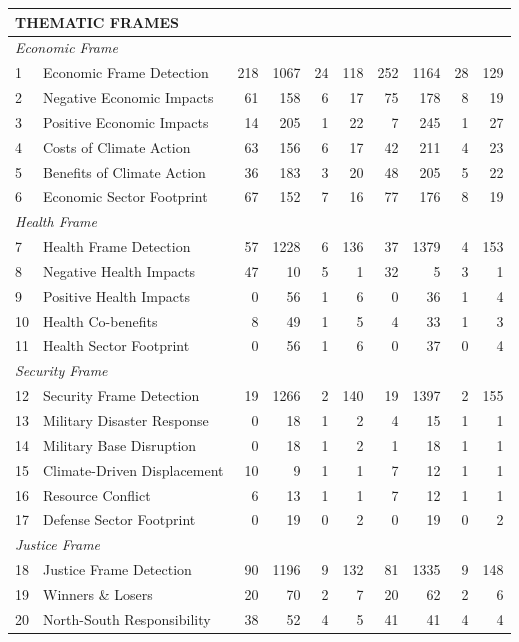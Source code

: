 {\begin{longtable}{p{0.5cm}p{5.5cm}rrrrrrrr}
\multicolumn{10}{l}{\cellcolor{gray!10}\textbf{THEMATIC FRAMES}} \\
\midrule
\multicolumn{10}{l}{\textit{Economic Frame}} \\
1 & Economic Frame Detection & 218 & 1067 & 24 & 118 & 252 & 1164 & 28 & 129 \\
2 & Negative Economic Impacts & 61 & 158 & 6 & 17 & 75 & 178 & 8 & 19 \\
3 & Positive Economic Impacts & 14 & 205 & 1 & 22 & 7 & 245 & 1 & 27 \\
4 & Costs of Climate Action & 63 & 156 & 6 & 17 & 42 & 211 & 4 & 23 \\
5 & Benefits of Climate Action & 36 & 183 & 3 & 20 & 48 & 205 & 5 & 22 \\
6 & Economic Sector Footprint & 67 & 152 & 7 & 16 & 77 & 176 & 8 & 19 \\
\multicolumn{10}{l}{\textit{Health Frame}} \\
7 & Health Frame Detection & 57 & 1228 & 6 & 136 & 37 & 1379 & 4 & 153 \\
8 & Negative Health Impacts & 47 & 10 & 5 & 1 & 32 & 5 & 3 & 1 \\
9 & Positive Health Impacts & 0 & 56 & 1 & 6 & 0 & 36 & 1 & 4 \\
10 & Health Co-benefits & 8 & 49 & 1 & 5 & 4 & 33 & 1 & 3 \\
11 & Health Sector Footprint & 0 & 56 & 1 & 6 & 0 & 37 & 0 & 4 \\
\multicolumn{10}{l}{\textit{Security Frame}} \\
12 & Security Frame Detection & 19 & 1266 & 2 & 140 & 19 & 1397 & 2 & 155 \\
13 & Military Disaster Response & 0 & 18 & 1 & 2 & 4 & 15 & 1 & 1 \\
14 & Military Base Disruption & 0 & 18 & 1 & 2 & 1 & 18 & 1 & 1 \\
15 & Climate-Driven Displacement & 10 & 9 & 1 & 1 & 7 & 12 & 1 & 1 \\
16 & Resource Conflict & 6 & 13 & 1 & 1 & 7 & 12 & 1 & 1 \\
17 & Defense Sector Footprint & 0 & 19 & 0 & 2 & 0 & 19 & 0 & 2 \\
\multicolumn{10}{l}{\textit{Justice Frame}} \\
18 & Justice Frame Detection & 90 & 1196 & 9 & 132 & 81 & 1335 & 9 & 148 \\
19 & Winners \& Losers & 20 & 70 & 2 & 7 & 20 & 62 & 2 & 6 \\
20 & North-South Responsibility & 38 & 52 & 4 & 5 & 41 & 41 & 4 & 4 \\

\end{longtable}}
